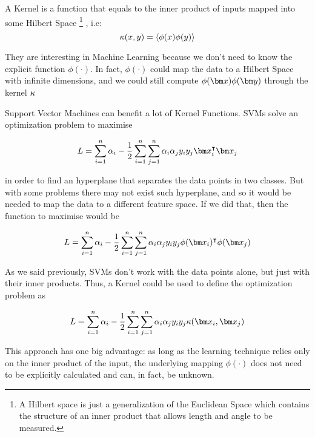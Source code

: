 \begin{pre-delivery}
  A Kernel is a function that equals to the inner product of inputs mapped into
  some Hilbert Space
  \footnote{A Hilbert space is just a generalization of the Euclidean Space which contains
  the structure of an inner product that allows length and angle to be
  measured.}
  , i.e:
  \begin{equation}
  \kappa(x,y) = \langle \phi(x)\phi(y) \rangle
\end{equation}

They are interesting in Machine Learning because we don't need to know the
explicit function $\phi(\cdot)$. In fact, $\phi(\cdot)$ could map the data to
a Hilbert Space with infinite dimensions, and we could still compute
$\phi(\vx)\phi(\vy)$ through the kernel $\kappa$

Support Vector Machines can benefit a lot of Kernel Functions. SVMs solve an
optimization problem to maximise

\begin{equation}
  L = \sum_{i = 1}^n\alpha_i -\frac{1}{2}\sum_{i = 1}^n\sum_{j = 1}^n\alpha_i\alpha_jy_iy_j\vx_i^\transp\vx_j
\end{equation}

in order to find an hyperplane that separates the data points in two classes.
But with some problems there may not exist such hyperplane, and so it would
be needed to map the data to a different feature space. If we did that, then
the function to maximise would be

\begin{equation}
  L = \sum_{i = 1}^n\alpha_i -\frac{1}{2}\sum_{i = 1}^n\sum_{j = 1}^n\alpha_i\alpha_jy_iy_j\phi(\vx_i)^\transp\phi(\vx_j)
\end{equation}

As we said previously, SVMs don't work with the data points alone, but just with
their inner products. Thus, a Kernel could be used to define the optimization
problem as

\begin{equation}
  L = \sum_{i = 1}^n\alpha_i -\frac{1}{2}\sum_{i = 1}^n\sum_{j = 1}^n\alpha_i\alpha_jy_iy_j\kernel(\vx_i, \vx_j)
\end{equation}

This approach has one big advantage:
as long as the learning technique relies
only on the inner product of the input, the underlying mapping $\phi(\cdot)$
does not need to be explicitly calculated and can, in fact, be unknown.


\end{pre-delivery}
